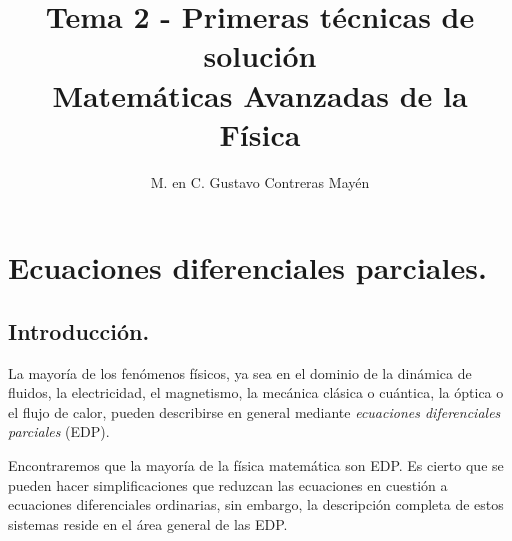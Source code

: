 
\usepackage{apacite}
\title{Tema 2 - Primeras técnicas de solución \\[0.3em]  \large{Matemáticas Avanzadas de la Física}\vspace{-3ex}}
\author{M. en C. Gustavo Contreras Mayén}
\date{ }

\vspace{-4cm}
\maketitle
\fontsize{14}{14}\selectfont
\tableofcontents
\newpage
\section{Ecuaciones diferenciales parciales.}
\subsection{Introducción.}
La mayoría de los fenómenos físicos, ya sea en el dominio de la dinámica de fluidos, la electricidad, el magnetismo, la mecánica clásica o cuántica, la óptica o el flujo de calor, pueden describirse en general mediante \emph{ecuaciones diferenciales parciales} (EDP).
\par
Encontraremos que la mayoría de la física matemática son EDP. Es cierto que se pueden hacer simplificaciones que reduzcan las ecuaciones en cuestión a ecuaciones diferenciales ordinarias, sin embargo, la descripción completa de estos sistemas reside en el área general de las EDP.
